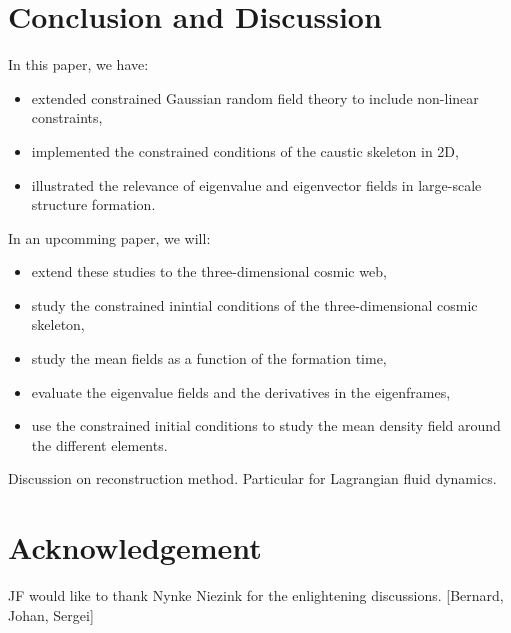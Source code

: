 \documentclass[a4paper, 11pt]{article}
\begin{document}
\section{Conclusion and Discussion}
In this paper, we have:
\begin{itemize}
\item extended constrained Gaussian random field theory to include non-linear constraints,
\item implemented the constrained conditions of the caustic skeleton in 2D,
\item illustrated the relevance of eigenvalue and eigenvector fields in large-scale structure formation.
\end{itemize}
In an upcomming paper, we will:
\begin{itemize}
\item extend these studies to the three-dimensional cosmic web,
\item study the constrained inintial conditions of the three-dimensional cosmic skeleton,
\item study the mean fields as a function of the formation time,
\item evaluate the eigenvalue fields and the derivatives in the eigenframes,
\item use the constrained initial conditions to study the mean density field around the different elements.
\end{itemize}

\begin{framed}
Discussion on reconstruction method. Particular for Lagrangian fluid dynamics.
\end{framed}

\section*{Acknowledgement}
JF would like to thank Nynke Niezink for the enlightening discussions. [Bernard, Johan, Sergei]



%




\appendix
\end{document}

